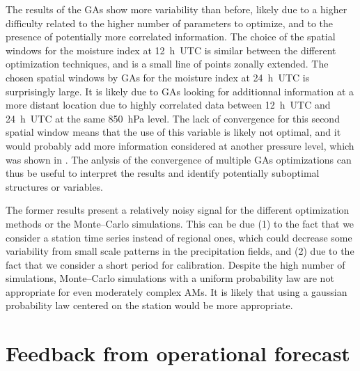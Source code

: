 \documentclass[review]{elsarticle}
\begin{document}
The results of the GAs show more variability than before, likely due to a higher difficulty related to the higher number of parameters to optimize, and to the presence of potentially more correlated information. The choice of the spatial windows for the moisture index at 12~h~UTC is similar between the different optimization techniques, and is a small line of points zonally extended. The chosen spatial windows by GAs for the moisture index at 24~h~UTC is surprisingly large. It is likely due to GAs looking for additionnal information at a more distant location due to highly correlated data between 12~h~UTC and 24~h~UTC at the same 850~hPa level. The lack of convergence for this second spatial window means that the use of this variable is likely not optimal, and it would probably add more information considered at another pressure level, which was shown in \citet{Horton2018a}. The anlysis of the convergence of multiple GAs optimizations can thus be useful to interpret the results and identify potentially suboptimal structures or variables.

The former results present a relatively noisy signal for the different optimization methods or the Monte--Carlo simulations. This can be due (1) to the fact that we consider a station time series instead of regional ones, which could decrease some variability from small scale patterns in the precipitation fields, and (2) due to the fact that we consider a short period for calibration. Despite the high number of simulations, Monte--Carlo simulations with a uniform probability law are not appropriate for even moderately complex AMs. It is likely that using a gaussian probability law centered on the station would be more appropriate.


\section{Feedback from operational forecast}
\label{sec:operational}
\end{document}
